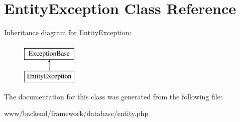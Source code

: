 \hypertarget{classEntityException}{
\section{EntityException Class Reference}
\label{classEntityException}
}
Inheritance diagram for EntityException:\begin{figure}[H]
\begin{center}
\leavevmode
\includegraphics[height=2.000000cm]{classEntityException}
\end{center}
\end{figure}


The documentation for this class was generated from the following file:\begin{DoxyCompactItemize}
\item 
www/backend/framework/database/entity.php\end{DoxyCompactItemize}
